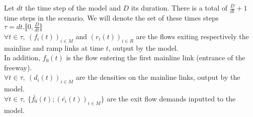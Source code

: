 Let $dt$ the time step of the model and $D$ its duration. There is a total of $\frac{D}{dt}+1$ time steps in the scenario. We will denote the set of these times steps $\tau=dt.\llbracket 0,\frac{D}{dt}\rrbracket $\\
$\forall t \in \tau,\ (f_{i}(t))_{i\in{M}}$ and $(r_{i}(t))_{i\in{R}}$ are the flows exiting respectively the mainline and ramp links at time $t$, output by the model.\\
In addition, $f_{0}(t)$ is the flow entering the first mainline link (entrance of the freeway).\\
$\forall t \in \tau,\ (d_{i}(t))_{i\in{M}} $ are the densities on the mainline links, output by the model.\\
$\forall t \in \tau,\ \big\{\bar{f_{0}}(t) ; (\bar{r_{i}}(t))_{i\in{M}} \big\} $ are the exit flow demands inputted to the model.\\